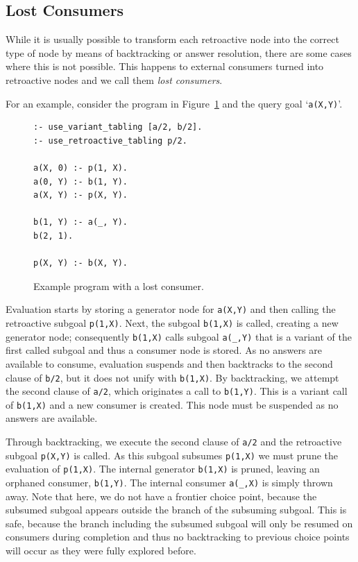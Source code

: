 \subsection{Lost Consumers}

While it is usually possible to transform each retroactive node into the correct type of node by means
of backtracking or answer resolution, there are some cases where this is not possible. This happens to
external consumers turned into retroactive nodes and we call them \textit{lost consumers}.

For an example, consider the program in Figure~\ref{fig:retro_lost_consumer_code} and the query goal
`\texttt{a(X,Y)}'.

\begin{figure}[ht]
\begin{Verbatim}
:- use_variant_tabling [a/2, b/2].
:- use_retroactive_tabling p/2.

a(X, 0) :- p(1, X).
a(0, Y) :- b(1, Y).
a(X, Y) :- p(X, Y).

b(1, Y) :- a(_, Y).
b(2, 1).

p(X, Y) :- b(X, Y).
\end{Verbatim}
\caption{Example program with a lost consumer.}
\label{fig:retro_lost_consumer_code}
\end{figure}

Evaluation starts by storing a generator node for \texttt{a(X,Y)} and then calling
the retroactive subgoal \texttt{p(1,X)}.
Next, the subgoal \texttt{b(1,X)} is called, creating a new
generator node; consequently \texttt{b(1,X)} calls subgoal \texttt{a(\_,Y)} that is a variant of the
first called subgoal and thus a consumer node is stored. As no answers are available to consume,
evaluation suspends and then backtracks to the second clause of \texttt{b/2}, but it does not
unify with \texttt{b(1,X)}. By backtracking, we attempt the second clause of \texttt{a/2}, which
originates a call to \texttt{b(1,Y)}. This is a variant call of \texttt{b(1,X)} and a new consumer is
created. This node must be suspended as no answers are available.

Through backtracking, we execute the second clause of \texttt{a/2} and the retroactive subgoal \texttt{p(X,Y)}
is called. As this subgoal subsumes \texttt{p(1,X)} we must prune the evaluation of \texttt{p(1,X)}.
The internal generator \texttt{b(1,X)} is pruned, leaving an orphaned consumer, \texttt{b(1,Y)}. The internal
consumer \texttt{a(\_,X)} is simply thrown away. Note that here, we do not have a frontier choice point,
because the subsumed subgoal appears outside the branch of the subsuming subgoal. This is safe, because
the branch including the subsumed subgoal will only be resumed on consumers during completion and thus
no backtracking to previous choice points will occur as they were fully explored before.

